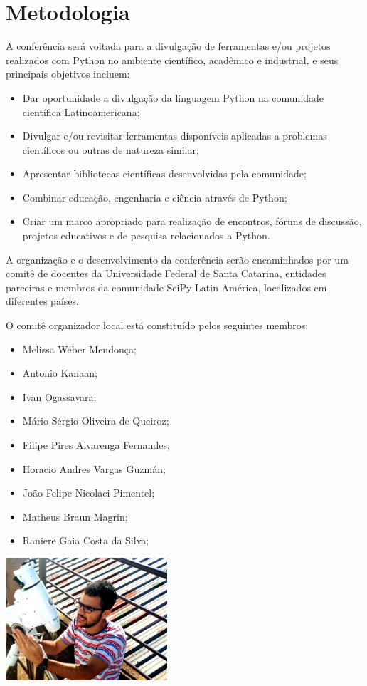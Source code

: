 \documentclass[a4paper,twocolumn,openright,article]{memoir}
\begin{document}
\chapter*{Metodologia}

A conferência será voltada para a divulgação de ferramentas e/ou projetos realizados com Python no ambiente científico, acadêmico e industrial, e seus principais objetivos incluem:
\begin{itemize}
\item Dar oportunidade a divulgação da linguagem Python na comunidade científica Latinoamericana;
\item Divulgar e/ou revisitar ferramentas disponíveis aplicadas a problemas científicos ou outras de natureza similar;
\item Apresentar bibliotecas científicas desenvolvidas pela comunidade;
\item Combinar educação, engenharia e ciência através de Python;
\item Criar um marco apropriado para realização de encontros, fóruns de discussão, projetos educativos e de pesquisa relacionados a Python.
\end{itemize}

A organização e o desenvolvimento da conferência serão encaminhados por um comitê de docentes da Universidade Federal de Santa Catarina, entidades parceiras e membros da comunidade SciPy Latin América, localizados em diferentes países. 

O comitê organizador local está constituído pelos seguintes membros:
\begin{itemize}
\item Melissa Weber Mendonça;
\item Antonio Kanaan;
\item Ivan Ogassavara;
\item Mário Sérgio Oliveira de Queiroz;
\item Filipe Pires Alvarenga Fernandes;
\item Horacio Andres Vargas Guzmán;
\item João Felipe Nicolaci Pimentel;
\item Matheus Braun Magrin;
\item Raniere Gaia Costa da Silva;
\end{itemize}

\ifprint
\else
	\begin{center}
		\includegraphics[width=6cm]{imagens/IMG_20150521_102919-small.jpg}
	\end{center}
\fi
\end{document}
